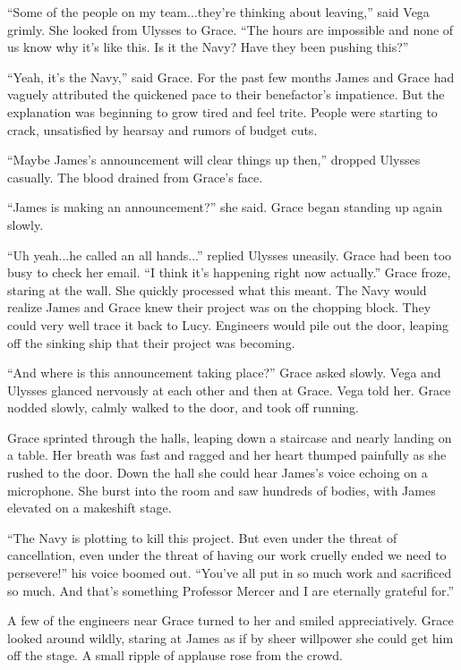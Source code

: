 \documentclass[openany, 12pt]{book} %
\begin{document}
``Some of the people on my team...they're thinking about leaving,'' said Vega grimly. She looked from Ulysses to Grace. ``The hours are impossible and none of us know why it's like this. Is it the Navy? Have they been pushing this?''

``Yeah, it's the Navy,'' said Grace. For the past few months James and Grace had vaguely attributed the quickened pace to their benefactor's impatience. But the explanation was beginning to grow tired and feel trite. People were starting to crack, unsatisfied by hearsay  and rumors of budget cuts.

``Maybe James's announcement will clear things up then,'' dropped Ulysses casually. The blood drained from Grace's face.

``James is making an announcement?'' she said. Grace began standing up again slowly.

``Uh yeah...he called an all hands...'' replied Ulysses uneasily. Grace had been too busy to check her email. ``I think it's happening right now actually.'' Grace froze, staring at the wall. She quickly processed what this meant. The Navy would realize James and Grace knew their project was on the chopping block. They could very well trace it back to Lucy. Engineers would pile out the door, leaping off the sinking ship that their project was becoming.

``And where is this announcement taking place?'' Grace asked slowly. Vega and Ulysses glanced nervously at each other and then at Grace. Vega told her. Grace nodded slowly, calmly walked to the door, and took off running.

Grace sprinted through the halls, leaping down a staircase and nearly landing on a table. Her breath was fast and ragged and her heart thumped painfully as she rushed to the door. Down the hall she could hear James's voice echoing on a microphone. She burst into the room and saw hundreds of bodies, with James elevated on a makeshift stage.

``The Navy is plotting to kill this project. But even under the threat of cancellation, even under the threat of having our work cruelly ended we need to persevere!'' his voice boomed out. ``You've all put in so much work and sacrificed so much. And that's something Professor Mercer and I are eternally grateful for.''

A few of the engineers near Grace turned to her and smiled appreciatively. Grace looked around wildly, staring at James as if by sheer willpower she could get him off the stage. A small ripple of applause rose from the crowd.
\end{document}

